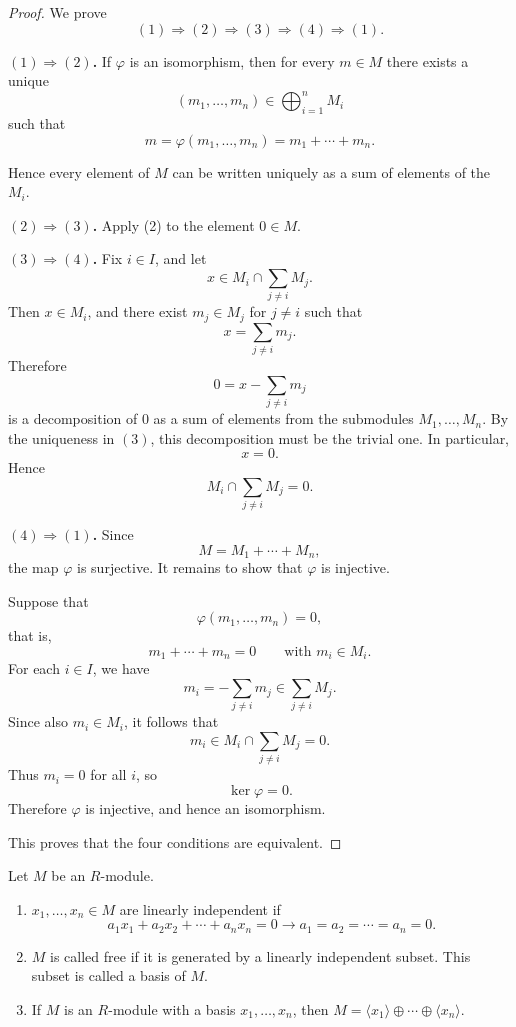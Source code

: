 \begin{proof}
    We prove
    \[
        (1)\Rightarrow(2)\Rightarrow(3)\Rightarrow(4)\Rightarrow(1).
    \]

    \noindent\textbf{$(1)\Rightarrow(2)$.}
    If $\varphi$ is an isomorphism, then for every $m\in M$ there exists a unique
    \[
        (m_1,\ldots,m_n)\in \bigoplus_{i=1}^n M_i
    \]
    such that
    \[
        m=\varphi(m_1,\ldots,m_n)=m_1+\cdots+m_n.
    \]

    Hence every element of $M$ can be written uniquely as a sum of elements of the $M_i$.

    \noindent\textbf{$(2)\Rightarrow(3)$.}
    Apply (2) to the element $0 \in M$.

    \noindent\textbf{$(3)\Rightarrow(4)$.}
    Fix $i\in I$, and let
    \[
        x\in M_i\cap \sum_{j\ne i} M_j.
    \]
    Then $x \in M_i$, and there exist $m_j \in M_j$ for $j \ne i$ such that
    \[
        x = \sum_{j\ne i} m_j.
    \]
    Therefore
    \[
        0 = x - \sum_{j\ne i} m_j
    \]
    is a decomposition of $0$ as a sum of elements from the submodules $M_1,\ldots,M_n$.
    By the uniqueness in $(3)$, this decomposition must be the trivial one. In particular,
    \[
        x = 0.
    \]
    Hence
    \[
        M_i\cap \sum_{j\ne i} M_j = 0.
    \]

    \noindent\textbf{$(4)\Rightarrow(1)$.}
    Since
    \[
        M = M_1+\cdots+M_n,
    \]
    the map $\varphi$ is surjective. It remains to show that $\varphi$ is injective.

    Suppose that
    \[
        \varphi(m_1,\ldots,m_n) = 0,
    \]
    that is,
    \[
        m_1+\cdots+m_n = 0
        \qquad \text{with } m_i \in M_i.
    \]
    For each $i \in I$, we have
    \[
        m_i = -\sum_{j\ne i} m_j \in \sum_{j\ne i} M_j.
    \]
    Since also $m_i \in M_i$, it follows that
    \[
        m_i \in M_i\cap \sum_{j\ne i} M_j = 0.
    \]
    Thus $m_i = 0$ for all $i$, so
    \[
        \ker\varphi = 0.
    \]
    Therefore $\varphi$ is injective, and hence an isomorphism.

    This proves that the four conditions are equivalent.
\end{proof}

\begin{definition}
    Let $M$ be an $R$-module.
    \begin{enumerate}
        \item $x_{1}, \dots, x_{n} \in M$ are linearly independent if
              \[
                  a_{1} x_{1} + a_{2} x_{2} + \cdots + a_{n} x_{n} = 0 \to a_{1} = a_{2} = \cdots = a_{n} = 0.
              \]
        \item $M$ is called free if it is generated by a linearly independent subset. This subset is called a basis of $M$.
        \item If $M$ is an $R$-module with a basis $x_{1}, \ldots, x_{n}$, then $M = \langle x_{1} \rangle \oplus \cdots \oplus \langle x_{n} \rangle$.
    \end{enumerate}
\end{definition}

